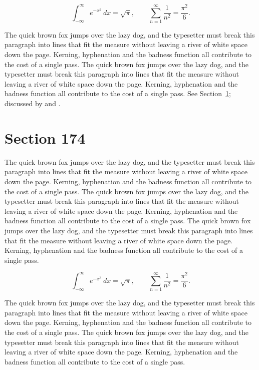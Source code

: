 \documentclass{article}
\begin{document}
\begin{equation}\label{eq:173}
\int_{-\infty}^{\infty} e^{-x^{2}}\,dx = \sqrt{\pi}, \qquad
\sum_{n=1}^{\infty} \frac{1}{n^{2}} = \frac{\pi^{2}}{6}.
\end{equation}

The quick brown fox jumps over the lazy dog, and the typesetter must break this paragraph into lines that fit the measure without leaving a river of white space down the page. Kerning, hyphenation and the badness function all contribute to the cost of a single pass. The quick brown fox jumps over the lazy dog, and the typesetter must break this paragraph into lines that fit the measure without leaving a river of white space down the page. Kerning, hyphenation and the badness function all contribute to the cost of a single pass. 
See Section~\ref{sec:174}; discussed by \textcite{k4} and \textcite{l1}.
\section{Section 174}
\label{sec:174}
The quick brown fox jumps over the lazy dog, and the typesetter must break this paragraph into lines that fit the measure without leaving a river of white space down the page. Kerning, hyphenation and the badness function all contribute to the cost of a single pass. The quick brown fox jumps over the lazy dog, and the typesetter must break this paragraph into lines that fit the measure without leaving a river of white space down the page. Kerning, hyphenation and the badness function all contribute to the cost of a single pass. The quick brown fox jumps over the lazy dog, and the typesetter must break this paragraph into lines that fit the measure without leaving a river of white space down the page. Kerning, hyphenation and the badness function all contribute to the cost of a single pass. 

\begin{equation}\label{eq:174}
\int_{-\infty}^{\infty} e^{-x^{2}}\,dx = \sqrt{\pi}, \qquad
\sum_{n=1}^{\infty} \frac{1}{n^{2}} = \frac{\pi^{2}}{6}.
\end{equation}

The quick brown fox jumps over the lazy dog, and the typesetter must break this paragraph into lines that fit the measure without leaving a river of white space down the page. Kerning, hyphenation and the badness function all contribute to the cost of a single pass. The quick brown fox jumps over the lazy dog, and the typesetter must break this paragraph into lines that fit the measure without leaving a river of white space down the page. Kerning, hyphenation and the badness function all contribute to the cost of a single pass. 
\end{document}
